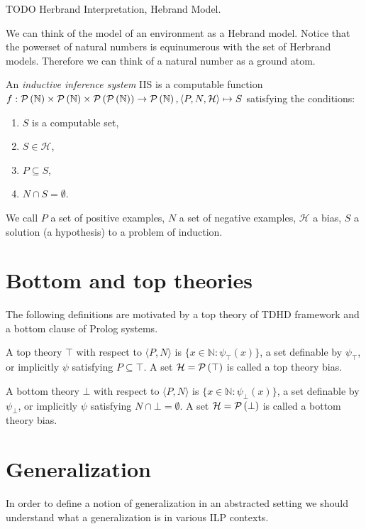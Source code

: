 \begin{defn}
TODO Herbrand Interpretation, Hebrand Model.
\end{defn}

We can think of the model of an environment as a Hebrand model. Notice that the powerset of natural numbers is equinumerous with the set of Herbrand models. Therefore we can think of a natural number as a ground atom.

\begin{defn}
An \emph{inductive inference system} IIS is a computable function
$f: \mathcal{P} \left({ \mathbb{N} }\right) \times \mathcal{P} \left({ \mathbb{N} }\right) \times \mathcal{P} \left({ \mathcal{P} \left({ \mathbb{N} }\right) }\right)
\to \mathcal{P} \left({ \mathbb{N} }\right),
\langle P, N, \mathcal{H} \rangle \mapsto S$
satisfying the conditions:

\begin{enumerate}
\item $S$ is a computable set,
\item $S \in \mathcal{H}$,
\item $P \subseteq S$,
\item $N \cap S = \emptyset$.
\end{enumerate}
\end{defn}

We call $P$ a set of positive examples, $N$ a set of negative examples, $\mathcal{H}$ a bias, $S$ a solution (a hypothesis) to a problem of induction.

\section{Bottom and top theories}
The following definitions are motivated by a top theory of TDHD framework and a bottom clause of Prolog systems.
\begin{defn}
A top theory $\top$ with respect to $\langle P, N \rangle$ is
$\{x \in \mathbb{N} : \psi_\top(x)\}$,
a set definable by $\psi_\top$, or implicitly $\psi$ satisfying
$P \subseteq \top$.
A set $\mathcal{H}=\mathcal{P} \left({ \top }\right)$ is called a top theory bias.
\end{defn}

\begin{defn}
A bottom theory $\bot$ with respect to $\langle P, N \rangle$ is
$\{x \in \mathbb{N} : \psi_\bot(x)\}$,
a set definable by $\psi_\bot$, or implicitly $\psi$ satisfying
$N \cap \bot = \emptyset$.
A set $\mathcal{H}=\mathcal{P} \left({ \bot }\right)$ is called a bottom theory bias.
\end{defn}

\section{Generalization}
In order to define a notion of generalization in an abstracted setting we should understand what a generalization is in various ILP contexts.

